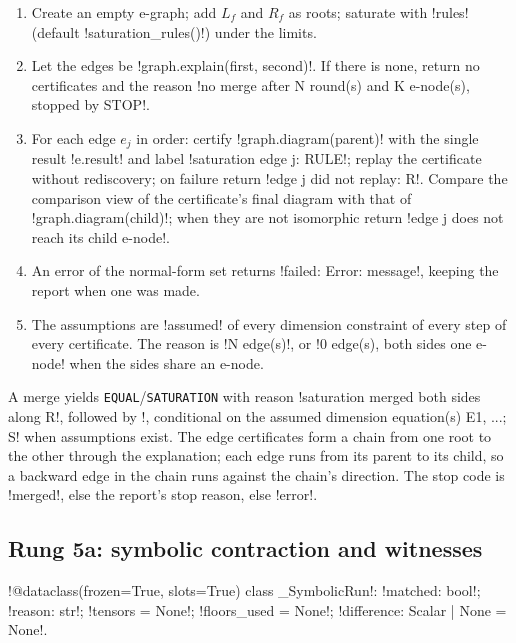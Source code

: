 \begin{algorithm}\label{alg:proofs-saturation}
\leavevmode
\begin{enumerate}
\item Create an empty e-graph; add $L_f$ and $R_f$ as roots; saturate with \py!rules! (default \py!saturation_rules()!) under the limits.
\item Let the edges be \py!graph.explain(first, second)!. If there is none, return no certificates and the reason \code!no merge after N round(s) and K e-node(s), stopped by STOP!.
\item For each edge $e_j$ in order: certify \py!graph.diagram(parent)! with the single result \py!e.result! and label \code!saturation edge j: RULE!; replay the certificate without rediscovery; on failure return \code!edge j did not replay: R!. Compare the comparison view of the certificate's final diagram with that of \py!graph.diagram(child)!; when they are not isomorphic return \code!edge j does not reach its child e-node!.
\item An error of the normal-form set returns \code!failed: Error: message!, keeping the report when one was made.
\item The assumptions are \py!assumed! of every dimension constraint of every step of every certificate. The reason is \code!N edge(s)!, or \code!0 edge(s), both sides one e-node! when the sides share an e-node.
\end{enumerate}
\end{algorithm}

A merge yields \texttt{EQUAL}/\allowbreak\texttt{SATURATION} with reason \code!saturation merged both sides along R!, followed by \code!, conditional on the assumed dimension equation(s) E1, ...; S! when assumptions exist. The edge certificates form a chain from one root to the other through the explanation; each edge runs from its parent to its child, so a backward edge in the chain runs against the chain's direction. The stop code is \code!merged!, else the report's stop reason, else \code!error!.

\subsection{Rung 5a: symbolic contraction and witnesses}\label{sec:proofs-rung-symbolic}

\begin{signature}
\py!@dataclass(frozen=True, slots=True) class _SymbolicRun!: \py!matched: bool!; \py!reason: str!; \py!tensors = None!; \py!floors_used = None!; \py!difference: Scalar | None = None!.
\end{signature}

